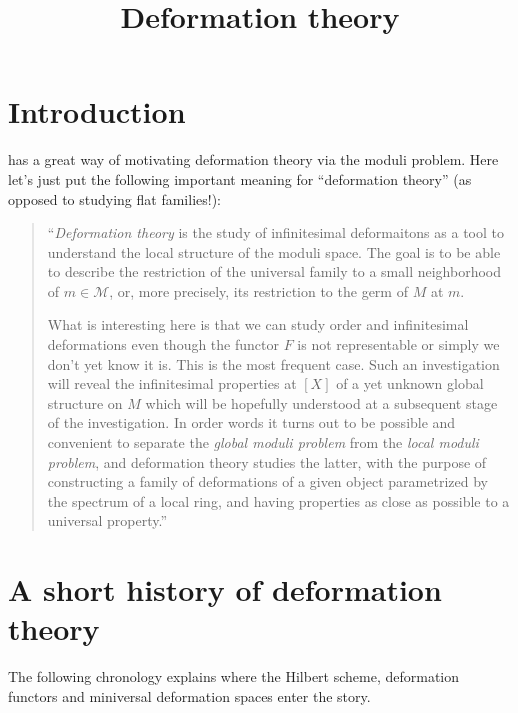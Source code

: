 



\title{Deformation theory}
\maketitle

\label{section-phantom}

\tableofcontents

\section{Introduction}
\label{section-intro}

\noindent
\cite{Sernesi-Overview} has a great way of
motivating deformation
theory via the moduli problem.
Here let's just put the following important
meaning for
``deformation theory'' (as opposed to
studying flat families!):

\begin{quote}
``{\it Deformation theory} is the study of
infinitesimal deformaitons
as a tool to understand the local structure
of the moduli space.
The goal is to be able to describe the
restriction
of the universal family to a small
neighborhood of $m \in \mathcal{M}$,
or, more precisely, its restriction to the
germ of $M$ at $m$.

What is interesting here is that we can study
order and infinitesimal
deformations even though the functor $F$ is
not representable or simply we don’t
yet know it is. This is the most frequent
case. Such an investigation will
reveal the infinitesimal properties at $[X]$
of a yet unknown global structure
on $M$ which will be hopefully understood at
a subsequent stage of the
investigation.  In order words it turns out
to be possible and convenient to
separate the {\it global moduli problem} from
the {\it local moduli problem},
and deformation theory studies the latter,
with the purpose of constructing a
family of deformations of a given object
parametrized by the spectrum of a local
ring, and having properties as close as
possible to a universal property.''
\end{quote}


\section{A short history of deformation theory}
\label{section-history-deformation-theory}

\noindent
The following chronology explains where the
Hilbert scheme, deformation functors and
miniversal deformation spaces enter the
story.

